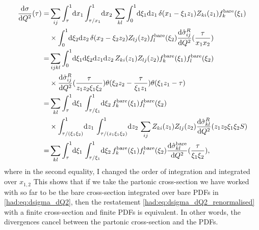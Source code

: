 \documentclass[../main.tex]{subfiles}
\begin{document}
\begin{align}
  \nonumber
  \d[Q^2]{\sigma}(\tau) = & \sum_ {ij} \integral[_\tau^1]{x_1}\!\integral[_{\tau/x_1}^1]{x_2} \sum_{kl} \integral[_0^1]{\xi_1\mathrm{d}z_1} \delta(x_1 - \xi_1 z_1) Z_{ki}(z_1) f_k^\text{bare}(\xi_1)          \\
  \nonumber
                          & \times \integral[_0^1]{\xi_2\mathrm{d}z_2} \delta(x_2 - \xi_2 z_2) Z_{lj}(z_2) f_l^\text{bare}(\xi_2) \d[Q^2]{\hat\sigma^R_{ij}}(\frac{\tau}{x_1 x_2})                              \\
  \nonumber
  =                       & \sum_{ijkl} \integral[_0^1]{\xi_1 \mathrm{d}\xi_2 \mathrm{d}z_1 \mathrm{d}z_2} Z_{ki}(z_1) Z_{lj}(z_2) f_k^\text{bare}(\xi_1) f_l^\text{bare}(\xi_2)                                \\
  \nonumber
                          & \times \d[Q^2]{\hat\sigma_{ij}^R}(\frac{\tau}{z_1 z_2 \xi_1 \xi_2}) \theta(\xi_2 z_2 - \frac{\tau}{\xi_1 z_1}) \theta(\xi_1 z_1 - \tau)                                             \\
  \nonumber
  =                       & \sum_{kl} \integral[_\tau^1]{\xi_1} \integral[_{\tau/\xi_1}^1]{\xi_2} f_k^\text{bare}(\xi_1) f_l^\text{bare}(\xi_2)                                                                 \\
  \nonumber
                          & \times \integral[_{\tau/(\xi_1 \xi_2)}^1]{z_1} \integral[_{\tau/(z_1 \xi_1 \xi_2)}^1]{z_2} \sum_{ij} Z_{ki}(z_1) Z_{lj}(z_2) \d[Q^2]{\hat\sigma_{kl}^R}(z_1z_2 \xi_1\xi_2 S)        \\
  =                       & \sum_{kl} \integral[_\tau^1]{\xi_1} \integral[_{\tau/\xi_1}^1]{\xi_2} f_k^\text{bare}(\xi_1) f_l^\text{bare}(\xi_2) \d[Q^2]{\hat\sigma^\text{bare}_{kl}}(\frac{\tau}{\xi_1 \xi_2}),
\end{align}
where in the second equality, I changed the order of integration and integrated over \(x_{1,2}\)
This shows that if we take the partonic cross-section we have worked with so far to be the bare cross-section integrated over bare PDFs in \cref{had:eq:dsigma_dQ2}, then the restatement \cref{had:eq:dsigma_dQ2_renormalised} with a finite cross-section and finite PDFs is equivalent.
In other words, the divergences cancel between the partonic cross-section and the PDFs.
\medskip
\end{document}
